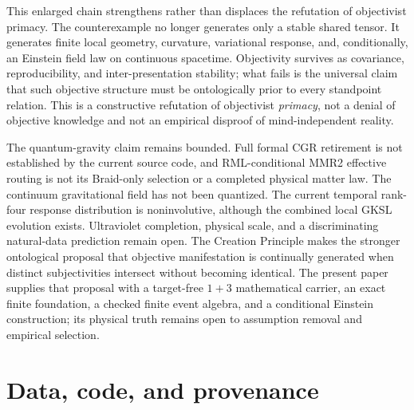 \documentclass[11pt]{article}
\theoremstyle{definition}
\theoremstyle{remark}
\begin{document}
This enlarged chain strengthens rather than displaces the refutation of objectivist primacy. The counterexample no longer generates only a stable shared tensor. It generates finite local geometry, curvature, variational response, and, conditionally, an Einstein field law on continuous spacetime. Objectivity survives as covariance, reproducibility, and inter-presentation stability; what fails is the universal claim that such objective structure must be ontologically prior to every standpoint relation. This is a constructive refutation of objectivist \emph{primacy}, not a denial of objective knowledge and not an empirical disproof of mind-independent reality.

The quantum-gravity claim remains bounded. Full formal CGR retirement is not established by the current source code, and RML-conditional MMR2 effective routing is not its Braid-only selection or a completed physical matter law. The continuum gravitational field has not been quantized. The current temporal rank-four response distribution is noninvolutive, although the combined local GKSL evolution exists. Ultraviolet completion, physical scale, and a discriminating natural-data prediction remain open. The Creation Principle makes the stronger ontological proposal that objective manifestation is continually generated when distinct subjectivities intersect without becoming identical. The present paper supplies that proposal with a target-free $1+3$ mathematical carrier, an exact finite foundation, a checked finite event algebra, and a conditional Einstein construction; its physical truth remains open to assumption removal and empirical selection.

\section*{Data, code, and provenance}
\end{document}

